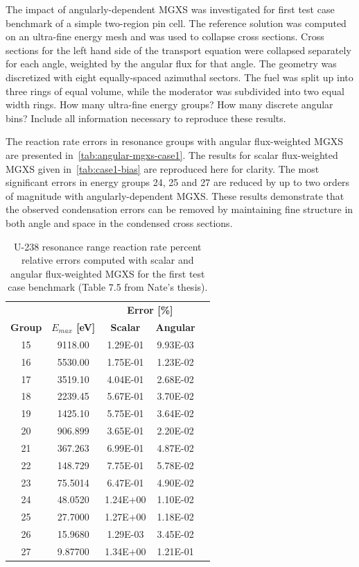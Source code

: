The impact of angularly-dependent MGXS was investigated for first test case benchmark of a simple two-region pin cell. The reference solution was computed on an ultra-fine energy mesh and was used to collapse cross sections. Cross sections for the left hand side of the transport equation were collapsed separately for each angle, weighted by the angular flux for that angle. The geometry was discretized with eight equally-spaced azimuthal sectors. The fuel was split up into three rings of equal volume, while the moderator was subdivided into two equal width rings. {\color{red} How many ultra-fine energy groups? How many discrete angular bins? Include all information necessary to reproduce these results.}

The reaction rate errors in resonance groups with angular flux-weighted MGXS are presented in~\autoref{tab:angular-mgxs-case1}. The results for scalar flux-weighted MGXS given in~\autoref{tab:case1-bias} are reproduced here for clarity. The most significant errors in energy groups 24, 25 and 27 are reduced by up to two orders of magnitude with angularly-dependent MGXS. These results demonstrate that the observed condensation errors can be removed by maintaining fine structure in both angle and space in the condensed cross sections.

\begin{table}[h!]
  \centering
  \caption{U-238 resonance range reaction rate percent relative errors computed with scalar and angular flux-weighted MGXS for the first test case benchmark {(\color{red}Table 7.5 from Nate's thesis)}.}
  \label{tab:angular-mgxs-case1}
  \begin{tabular}{c c c c c}
  \toprule
  & & \multicolumn{2}{c}{\textbf{Error [\%]}} \\
  \cline{3-4}
  \textbf{Group} & \textbf{\boldmath$E_{max}$ [eV]} & \textbf{Scalar} & \textbf{Angular} \\
  \midrule
  15 & 9118.00 & 1.29E-01 & 9.93E-03 \\
  16 & 5530.00 & 1.75E-01 & 1.23E-02 \\
  17 & 3519.10 & 4.04E-01 & 2.68E-02 \\
  18 & 2239.45 & 5.67E-01 & 3.70E-02 \\
  19 & 1425.10 & 5.75E-01 & 3.64E-02 \\
  20 & 906.899 & 3.65E-01 & 2.20E-02 \\
  21 & 367.263 & 6.99E-01 & 4.87E-02 \\
  22 & 148.729 & 7.75E-01 & 5.78E-02 \\
  23 & 75.5014 & 6.47E-01 & 4.90E-02 \\
  24 & 48.0520 & 1.24E+00 & 1.10E-02 \\
  25 & 27.7000 & 1.27E+00 & 1.18E-02 \\
  26 & 15.9680 & 1.29E-03 & 3.45E-02 \\
  27 & 9.87700 & 1.34E+00 & 1.21E-01 \\
  \bottomrule
\end{tabular}
\end{table}

